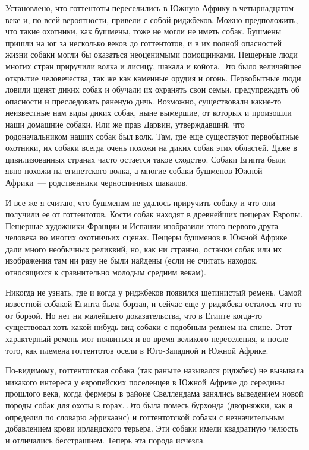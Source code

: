 \documentclass[12pt,a4paper,twoside,openany,svgnames]{memoir}
\begin{document}
Установлено, что готтентоты переселились в Южную Африку в четырнадцатом веке и, по всей вероятности, привели с собой риджбеков. Можно предположить, что такие охотники, как бушмены, тоже не могли не иметь собак. Бушмены пришли на юг за несколько веков до готтентотов, и в их полной опасностей жизни собаки могли бы оказаться неоценимыми помощниками. Пещерные люди многих стран приручили волка и лисицу, шакала и койота. Это было величайшее открытие человечества, так же как каменные орудия и огонь. Первобытные люди ловили щенят диких собак и обучали их охранять свои семьи, предупреждать об опасности и преследовать раненую дичь. Возможно, существовали какие-то неизвестные нам виды диких собак, ныне вымершие, от которых и произошли наши домашние собаки. Или же прав Дарвин, утверждавший, что родоначальником наших собак был волк. Там, где еще существуют первобытные охотники, их собаки всегда очень похожи на диких собак этих областей. Даже в цивилизованных странах часто остается такое сходство. Собаки Египта были явно похожи на египетского волка, а многие собаки бушменов Южной Африки~--- родственники черноспинных шакалов.

И все же я считаю, что бушменам не удалось приручить собаку и что они получили ее от готтентотов. Кости собак находят в древнейших пещерах Европы. Пещерные художники Франции и Испании изобразили этого первого друга человека во многих охотничьих сценах. Пещеры бушменов в Южной Африке дали много необычных реликвий, но, как ни странно, останки собак или их изображения там ни разу не были найдены (если не считать находок, относящихся к сравнительно молодым средним векам).

Никогда не узнать, где и когда у риджбеков появился щетинистый ремень. Самой известной собакой Египта была борзая, и сейчас еще у риджбека осталось что-то от борзой. Но нет ни малейшего доказательства, что в Египте когда-то существовал хоть какой-нибудь вид собаки с подобным ремнем на спине. Этот характерный ремень мог появиться и во время великого переселения, и после того, как племена готтентотов осели в Юго-Западной и Южной Африке.

По-видимому, готтентотская собака (так раньше назывался риджбек) не вызывала никакого интереса у европейских поселенцев в Южной Африке до середины прошлого века, когда фермеры в районе Свеллендама занялись выведением новой породы собак для охоты в горах. Это была помесь бурхонда (дворняжки, как я определил по словарю африкаанс) и готтентотской собаки с незначительным добавлением крови ирландского терьера. Эти собаки имели квадратную челюсть и отличались бесстрашием. Теперь эта порода исчезла.
\end{document}
